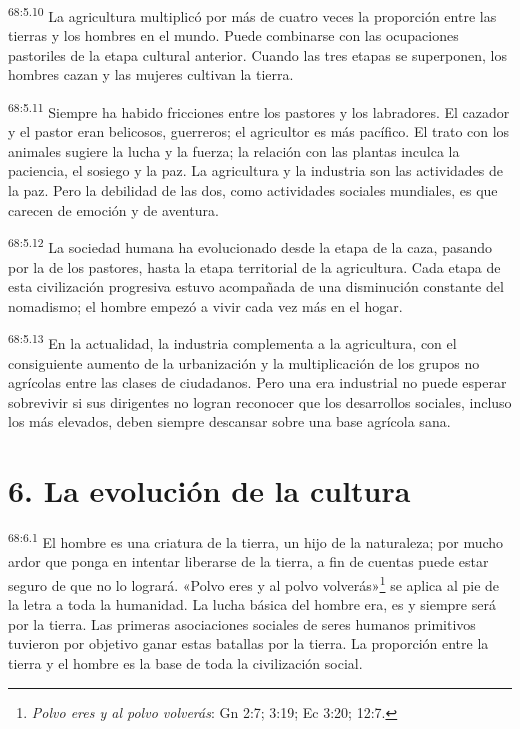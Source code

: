 \par
\textsuperscript{68:5.10} La agricultura multiplicó por más de cuatro veces la proporción entre las tierras y los hombres en el mundo. Puede combinarse con las ocupaciones pastoriles de la etapa cultural anterior. Cuando las tres etapas se superponen, los hombres cazan y las mujeres cultivan la tierra.

\par
\textsuperscript{68:5.11} Siempre ha habido fricciones entre los pastores y los labradores. El cazador y el pastor eran belicosos, guerreros; el agricultor es más pacífico. El trato con los animales sugiere la lucha y la fuerza; la relación con las plantas inculca la paciencia, el sosiego y la paz. La agricultura y la industria son las actividades de la paz. Pero la debilidad de las dos, como actividades sociales mundiales, es que carecen de emoción y de aventura.

\par
\textsuperscript{68:5.12} La sociedad humana ha evolucionado desde la etapa de la caza, pasando por la de los pastores, hasta la etapa territorial de la agricultura. Cada etapa de esta civilización progresiva estuvo acompañada de una disminución constante del nomadismo; el hombre empezó a vivir cada vez más en el hogar.

\par
\textsuperscript{68:5.13} En la actualidad, la industria complementa a la agricultura, con el consiguiente aumento de la urbanización y la multiplicación de los grupos no agrícolas entre las clases de ciudadanos. Pero una era industrial no puede esperar sobrevivir si sus dirigentes no logran reconocer que los desarrollos sociales, incluso los más elevados, deben siempre descansar sobre una base agrícola sana.

\section*{6. La evolución de la cultura}
\par
\textsuperscript{68:6.1} El hombre es una criatura de la tierra, un hijo de la naturaleza; por mucho ardor que ponga en intentar liberarse de la tierra, a fin de cuentas puede estar seguro de que no lo logrará. «Polvo eres y al polvo volverás»\footnote{\textit{Polvo eres y al polvo volverás}: Gn 2:7; 3:19; Ec 3:20; 12:7.} se aplica al pie de la letra a toda la humanidad. La lucha básica del hombre era, es y siempre será por la tierra. Las primeras asociaciones sociales de seres humanos primitivos tuvieron por objetivo ganar estas batallas por la tierra. La proporción entre la tierra y el hombre es la base de toda la civilización social.

